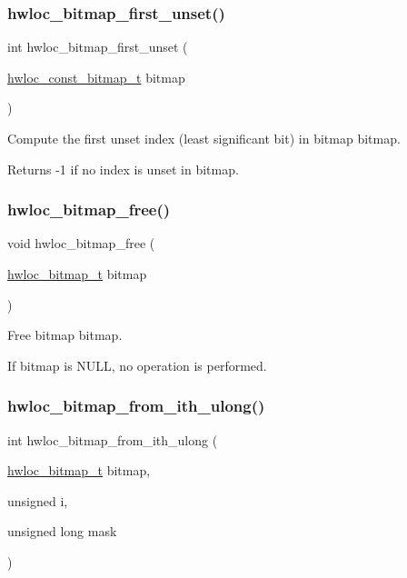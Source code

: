 \subsubsection{\texorpdfstring{hwloc\+\_\+bitmap\+\_\+first\+\_\+unset()}{hwloc\_bitmap\_first\_unset()}}
{\footnotesize\ttfamily int hwloc\+\_\+bitmap\+\_\+first\+\_\+unset (\begin{DoxyParamCaption}\item[{\hyperlink{a00205_gae991a108af01d408be2776c5b2c467b2}{hwloc\+\_\+const\+\_\+bitmap\+\_\+t}}]{bitmap }\end{DoxyParamCaption})}



Compute the first unset index (least significant bit) in bitmap {\ttfamily bitmap}. 

\begin{DoxyReturn}{Returns}
-\/1 if no index is unset in {\ttfamily bitmap}. 
\end{DoxyReturn}
\mbox{\label{a00205_ga156130d85b3a0674d6e0e6770fe68fbe}} 
\subsubsection{\texorpdfstring{hwloc\+\_\+bitmap\+\_\+free()}{hwloc\_bitmap\_free()}}
{\footnotesize\ttfamily void hwloc\+\_\+bitmap\+\_\+free (\begin{DoxyParamCaption}\item[{\hyperlink{a00205_gaa3c2bf4c776d603dcebbb61b0c923d84}{hwloc\+\_\+bitmap\+\_\+t}}]{bitmap }\end{DoxyParamCaption})}



Free bitmap {\ttfamily bitmap}. 

If {\ttfamily bitmap} is {\ttfamily N\+U\+LL}, no operation is performed. \mbox{\label{a00205_ga4947c46d47bcfcd3faf3f59569be3e37}} 
\subsubsection{\texorpdfstring{hwloc\+\_\+bitmap\+\_\+from\+\_\+ith\+\_\+ulong()}{hwloc\_bitmap\_from\_ith\_ulong()}}
{\footnotesize\ttfamily int hwloc\+\_\+bitmap\+\_\+from\+\_\+ith\+\_\+ulong (\begin{DoxyParamCaption}\item[{\hyperlink{a00205_gaa3c2bf4c776d603dcebbb61b0c923d84}{hwloc\+\_\+bitmap\+\_\+t}}]{bitmap,  }\item[{unsigned}]{i,  }\item[{unsigned long}]{mask }\end{DoxyParamCaption})}



